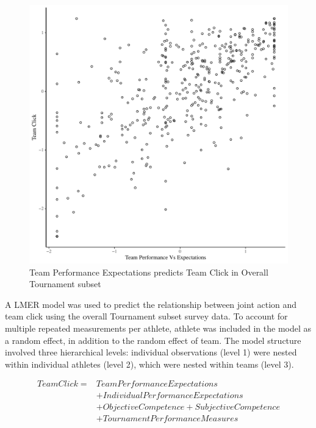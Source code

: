 \begin{CJK}{UTF8}{gbsn}
\begin{figure}[htbp]
  \centering
\includegraphics[scale=.5]{images/teamPerfClickOverallBasicXY.pdf}
  \caption{Team Performance Expectations predicts Team Click in Overall Tournament subset}
  \label{fig:teamPerfClickOverallBasicXY}
\end{figure}

A LMER model was used to predict the relationship between joint action and team click using the overall Tournament subset survey data.  To account for multiple repeated measurements per athlete, athlete was included in the model as a random effect, in addition to the random effect of team.  The model structure involved three hierarchical levels: individual observations (level 1) were nested within individual athletes (level 2), which were nested within teams (level 3).


       \begin{align*}
         Team Click =  & Team Performance Expectations  \\
                   &+ Individual Performance Expectations   \\
                   &+ Objective Competence + Subjective Competence \\
                   &+ TournamentPerformanceMeasures  \\
       \end{align*}


\end{CJK}
